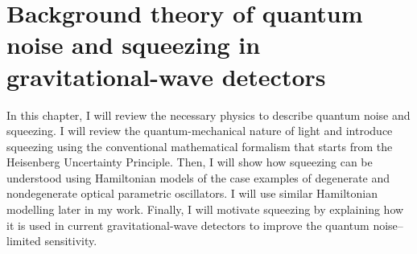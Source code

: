 \chapter{Background theory of quantum noise and squeezing in gravitational-wave detectors} %
\label{chp:background_theory}





In this chapter, I will review the necessary physics to describe quantum noise and squeezing. I will review the quantum-mechanical nature of light and introduce squeezing using the conventional mathematical formalism that starts from the Heisenberg Uncertainty Principle. Then, I will show how squeezing can be understood using Hamiltonian models of the case examples of degenerate and nondegenerate optical parametric oscillators. I will use similar Hamiltonian modelling later in my work. %
Finally, I will motivate squeezing by explaining how it is used in current gravitational-wave detectors to improve the quantum noise--limited sensitivity. %


